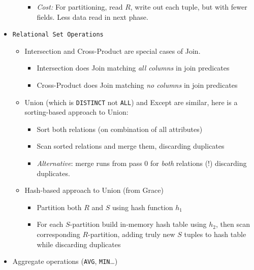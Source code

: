 \documentclass[landscape,8pt]{extarticle}
\newcommand{\code}{\lstinline}
\begin{document}
\begin{multicols}{5}
\begin{itemize}
\begin{itemize}
\begin{itemize}
                            \item \emph{Cost:} For partitioning, read $R$, write out each tuple, but with fewer fields. Less data read in next phase.
                        \end{itemize}
              \end{itemize}
        \item \code{Relational Set Operations}
              \begin{itemize}
                  \item Intersection and Cross-Product are special cases of Join.
                        \begin{itemize}
                            \item Intersection does Join matching \emph{all columns} in join predicates
                            \item Cross-Product does Join matching \emph{no columns} in join predicates
                        \end{itemize}
                  \item Union (which is \code{DISTINCT} not \code{ALL}) and Except are similar, here is a sorting-based approach to Union:
                        \begin{itemize}
                            \item Sort both relations (on combination of all attributes)
                            \item Scan sorted relations and merge them, discarding duplicates
                            \item \emph{Alternative}: merge runs from pass 0 for \emph{both} relations (!) discarding duplicates.
                        \end{itemize}
                  \item Hash-based approach to Union (from Grace)
                        \begin{itemize}
                            \item Partition both $R$ and $S$ using hash function $h_1$
                            \item For each $S$-partition build in-memory hash table using $h_2$, then scan corresponding $R$-partition, adding truly new $S$ tuples to hash table while discarding duplicates
                        \end{itemize}
              \end{itemize}
        \item Aggregate operations (\code{AVG}, \code{MIN}\ldots)

\end{itemize}
\end{multicols}
\end{document}
